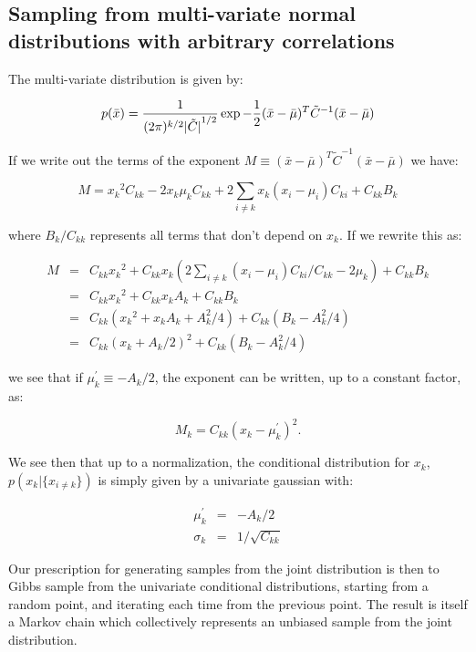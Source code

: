 \subsection{Sampling from multi-variate normal distributions with arbitrary correlations}

The multi-variate distribution is given by:

\begin{equation}
p(\bar{x}) = {1\over{(2\pi)^{k/2}{|\tilde{C}|}^{1/2}}}\,{\exp{-{1\over{2}}{(\bar{x} - \bar{\mu})^T\tilde{C}^{-1}{(\bar{x} - \bar{\mu})}}}}
\end{equation}

If we write out the terms of the exponent $M \equiv (\bar{x} - \bar{\mu})^T\tilde{C}^{-1}(\bar{x} - \bar{\mu})$
we have:

\begin{equation}
M = {x_k}^2 C_{kk} - 2x_k\mu_kC_{kk} + 2\sum_{i \neq k}{x_k(x_i - \mu_i)C_{ki}} + C_{kk}B_k
\end{equation}

where $B_k/C_{kk}$ represents all terms that don't depend on $x_k$. If we rewrite this as:

\begin{eqnarray}
M &=& C_{kk}{x_k}^2 + C_{kk}x_k\left(2\sum_{i \neq k}{(x_i - \mu_i)C_{ki}/C_{kk} - 2\mu_k}\right) + C_{kk}B_k\\
  &=& C_{kk}{x_k}^2 + C_{kk}x_kA_k + C_{kk}B_k\\
  &=& C_{kk}\left({x_k}^2 + x_kA_k + A_k^2/4\right) + C_{kk}\left(B_k - A_k^2/4\right) \\
  &=& C_{kk}\left(x_k + A_k/2\right)^2 + C_{kk}\left(B_k - A_k^2/4\right) 
\end{eqnarray}

we see that if $\mu_k^\prime \equiv -A_k/2$, the exponent can be written, up to a constant factor, as:

\begin{equation}
M_k = C_{kk}\left(x_k - \mu_k^\prime\right)^2.  
\end{equation}

We see then that up to a normalization, the conditional distribution for
$x_k$, $p(x_k|\{x_{i\neq k}\})$ is simply given by a univariate gaussian
with:

\begin{eqnarray}
\mu_k^\prime &=& -A_k/2 \\
\sigma_k   &=& 1/\sqrt{C_{kk}}
\end{eqnarray}

Our prescription for generating samples from the joint distribution is
then to Gibbs sample from the univariate conditional distributions,
starting from a random point, and iterating each time from the
previous point.  The result is itself a Markov chain which
collectively represents an unbiased sample from the joint
distribution.

